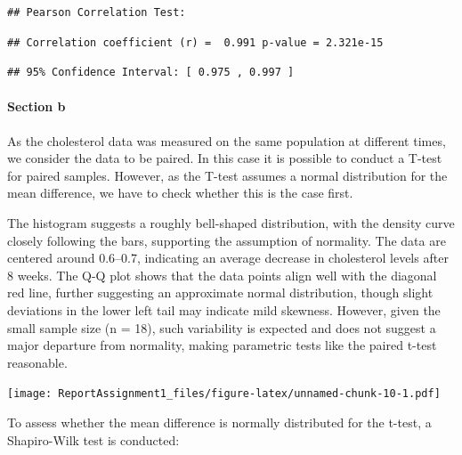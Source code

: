 \documentclass[
  11pt,
]{article}
\newenvironment{Shaded}{\begin{snugshade}}{\end{snugshade}}
\newcommand{\AttributeTok}[1]{\textcolor[rgb]{0.13,0.29,0.53}{#1}}
\newcommand{\FunctionTok}[1]{\textcolor[rgb]{0.13,0.29,0.53}{\textbf{#1}}}
\newcommand{\NormalTok}[1]{#1}
\newcommand{\OtherTok}[1]{\textcolor[rgb]{0.56,0.35,0.01}{#1}}
\newcommand{\SpecialCharTok}[1]{\textcolor[rgb]{0.81,0.36,0.00}{\textbf{#1}}}
\newcommand{\StringTok}[1]{\textcolor[rgb]{0.31,0.60,0.02}{#1}}
\begin{document}
\begin{Shaded}
\end{Shaded}

\begin{verbatim}
## Pearson Correlation Test:
\end{verbatim}

\begin{verbatim}
## Correlation coefficient (r) =  0.991 p-value = 2.321e-15
\end{verbatim}

\begin{verbatim}
## 95% Confidence Interval: [ 0.975 , 0.997 ]
\end{verbatim}

\paragraph{Section b}\label{section-b}

As the cholesterol data was measured on the same population at different
times, we consider the data to be paired. In this case it is possible to
conduct a T-test for paired samples. However, as the T-test assumes a
normal distribution for the mean difference, we have to check whether
this is the case first.

The histogram suggests a roughly bell-shaped distribution, with the
density curve closely following the bars, supporting the assumption of
normality. The data are centered around 0.6--0.7, indicating an average
decrease in cholesterol levels after 8 weeks. The Q-Q plot shows that
the data points align well with the diagonal red line, further
suggesting an approximate normal distribution, though slight deviations
in the lower left tail may indicate mild skewness. However, given the
small sample size (n = 18), such variability is expected and does not
suggest a major departure from normality, making parametric tests like
the paired t-test reasonable.

\texttt{[image: ReportAssignment1\_files/figure-latex/unnamed-chunk-10-1.pdf]}

To assess whether the mean difference is normally distributed for the
t-test, a Shapiro-Wilk test is conducted:
\end{document}
